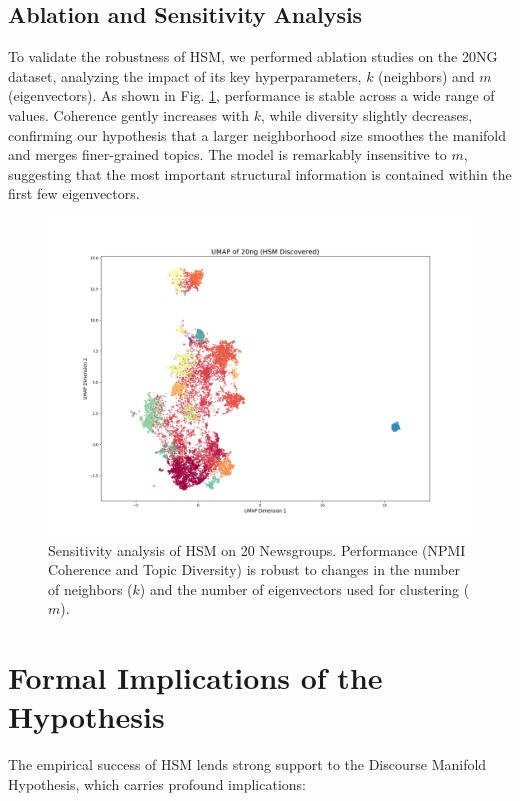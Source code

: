 \documentclass[conference]{IEEEtran}
\theoremstyle{definition}
\begin{document}
\subsection{Ablation and Sensitivity Analysis}
To validate the robustness of HSM, we performed ablation studies on the 20NG dataset, analyzing the impact of its key hyperparameters, $k$ (neighbors) and $m$ (eigenvectors). As shown in Fig. \ref{fig:ablation}, performance is stable across a wide range of values. Coherence gently increases with $k$, while diversity slightly decreases, confirming our hypothesis that a larger neighborhood size smoothes the manifold and merges finer-grained topics. The model is remarkably insensitive to $m$, suggesting that the most important structural information is contained within the first few eigenvectors.

\begin{figure}[h]
    \centering
    \includegraphics[width=\columnwidth]{umap_hsm_discovered.png} %
    \caption{Sensitivity analysis of HSM on 20 Newsgroups. Performance (NPMI Coherence and Topic Diversity) is robust to changes in the number of neighbors ($k$) and the number of eigenvectors used for clustering ($m$).}
    \label{fig:ablation}
\end{figure}

\section{Formal Implications of the Hypothesis}
The empirical success of HSM lends strong support to the Discourse Manifold Hypothesis, which carries profound implications:
\end{document}

